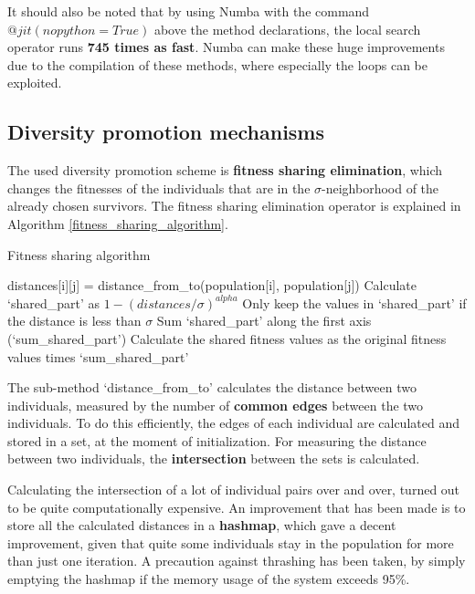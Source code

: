 \documentclass[a4paper,10pt]{article}
\newcommand{\ReplaceMe}[1]{{\color{blue}#1}}
\begin{document}
It should also be noted that by using Numba with the command $@jit(nopython=True)$ above the method declarations, the local search operator runs \textbf{745 times as fast}. Numba can make these huge improvements due to the compilation of these methods, where especially the loops can be exploited.

\subsection{Diversity promotion mechanisms}
\label{diversity_promotion}
The used diversity promotion scheme is \textbf{fitness sharing elimination}, which changes the fitnesses of the individuals that are in the $\sigma$-neighborhood of the already chosen survivors. The fitness sharing elimination operator is explained in Algorithm \ref{fitness_sharing_algorithm}.

\begin{algorithm}
\begin{algorithmic}
\caption{Fitness sharing algorithm}
\label{fitness_sharing_algorithm}
\State distances[i][j] = distance\_from\_to(population[i], population[j])
\EndFor
\EndFor
\State Calculate `shared\_part' as $1 - (distances / \sigma)^{alpha}$
\State Only keep the values in `shared\_part' if the distance is less than $\sigma$
\State Sum `shared\_part' along the first axis (`sum\_shared\_part')
\State Calculate the shared fitness values as the original fitness values times `sum\_shared\_part'
\end{algorithmic}
\end{algorithm}

The sub-method `distance\_from\_to' calculates the distance between two individuals, measured by the number of \textbf{common edges} between the two individuals. To do this efficiently, the edges of each individual are calculated and stored in a set, at the moment of initialization. For measuring the distance between two individuals, the \textbf{intersection} between the sets is calculated.

Calculating the intersection of a lot of individual pairs over and over, turned out to be quite computationally expensive. An improvement that has been made is to store all the calculated distances in a \textbf{hashmap}, which gave a decent improvement, given that quite some individuals stay in the population for more than just one iteration. A precaution against thrashing has been taken, by simply emptying the hashmap if the memory usage of the system exceeds 95\%.
\end{document}
